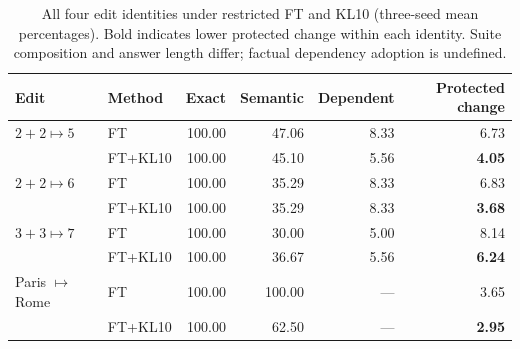 \begin{table}[t]
\centering
\caption{All four edit identities under restricted FT and KL10 (three-seed mean percentages). Bold indicates lower protected change within each identity. Suite composition and answer length differ; factual dependency adoption is undefined.}
\label{tab:secondary}
\begin{tabular}{@{}llrrrr@{}}
\toprule
Edit & Method & Exact & Semantic & Dependent & Protected change\\
\midrule
$2+2\mapsto5$ & FT & 100.00 & 47.06 & 8.33 & 6.73\\
 & FT+KL10 & 100.00 & 45.10 & 5.56 & \textbf{4.05}\\
$2+2\mapsto6$ & FT & 100.00 & 35.29 & 8.33 & 6.83\\
 & FT+KL10 & 100.00 & 35.29 & 8.33 & \textbf{3.68}\\
$3+3\mapsto7$ & FT & 100.00 & 30.00 & 5.00 & 8.14\\
 & FT+KL10 & 100.00 & 36.67 & 5.56 & \textbf{6.24}\\
Paris $\mapsto$ Rome & FT & 100.00 & 100.00 & --- & 3.65\\
 & FT+KL10 & 100.00 & 62.50 & --- & \textbf{2.95}\\
\bottomrule
\end{tabular}
\end{table}
